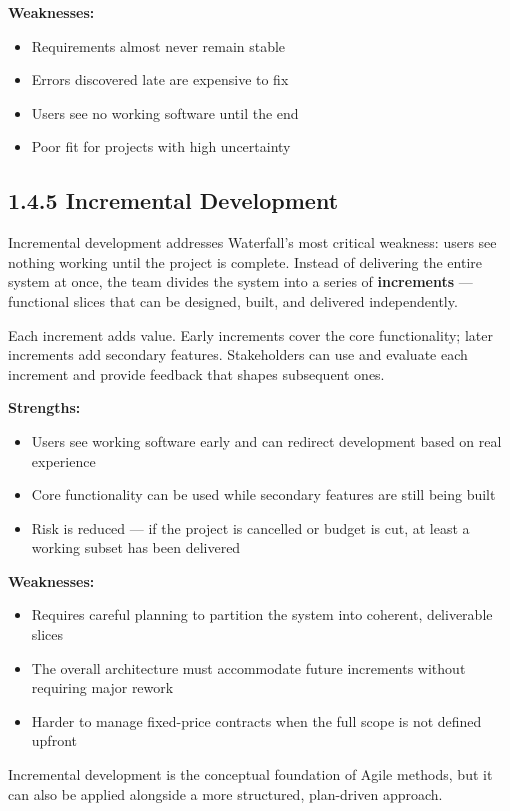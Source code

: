 \documentclass[11pt,a4paper]{book}
\begin{document}
\textbf{Weaknesses:}
\begin{itemize}
  \item Requirements almost never remain stable
  \item Errors discovered late are expensive to fix
  \item Users see no working software until the end
  \item Poor fit for projects with high uncertainty
\end{itemize}

\subsection{1.4.5 Incremental Development}

Incremental development addresses Waterfall's most critical weakness: users see nothing working until the project is complete. Instead of delivering the entire system at once, the team divides the system into a series of \textbf{increments} --- functional slices that can be designed, built, and delivered independently.

Each increment adds value. Early increments cover the core functionality; later increments add secondary features. Stakeholders can use and evaluate each increment and provide feedback that shapes subsequent ones.

\textbf{Strengths:}
\begin{itemize}
  \item Users see working software early and can redirect development based on real experience
  \item Core functionality can be used while secondary features are still being built
  \item Risk is reduced --- if the project is cancelled or budget is cut, at least a working subset has been delivered
\end{itemize}

\textbf{Weaknesses:}
\begin{itemize}
  \item Requires careful planning to partition the system into coherent, deliverable slices
  \item The overall architecture must accommodate future increments without requiring major rework
  \item Harder to manage fixed-price contracts when the full scope is not defined upfront
\end{itemize}

Incremental development is the conceptual foundation of Agile methods, but it can also be applied alongside a more structured, plan-driven approach.
\end{document}
